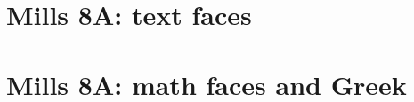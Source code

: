 \documentclass[11pt]{article}
\begin{document}
\section*{Mills 8A: text faces}
\TextAlphabetSamples
\clearpage
\section*{Mills 8A: math faces and Greek}
\AlphabetSamples
\end{document}
